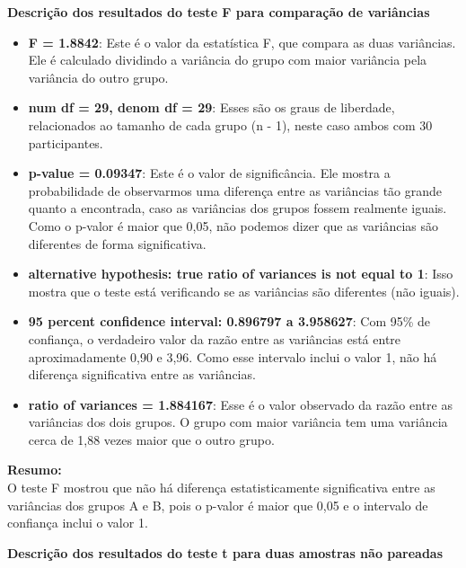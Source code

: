 \documentclass[
]{book}
\providecommand{\tightlist}{%
  \setlength{\itemsep}{0pt}\setlength{\parskip}{0pt}}
\begin{document}
\textbf{Descrição dos resultados do teste F para comparação de variâncias}

\begin{itemize}
\tightlist
\item
  \textbf{F = 1.8842}: Este é o valor da estatística F, que compara as duas variâncias. Ele é calculado dividindo a variância do grupo com maior variância pela variância do outro grupo.
\item
  \textbf{num df = 29, denom df = 29}: Esses são os graus de liberdade, relacionados ao tamanho de cada grupo (n - 1), neste caso ambos com 30 participantes.
\item
  \textbf{p-value = 0.09347}: Este é o valor de significância. Ele mostra a probabilidade de observarmos uma diferença entre as variâncias tão grande quanto a encontrada, caso as variâncias dos grupos fossem realmente iguais. Como o p-valor é maior que 0,05, não podemos dizer que as variâncias são diferentes de forma significativa.
\item
  \textbf{alternative hypothesis: true ratio of variances is not equal to 1}: Isso mostra que o teste está verificando se as variâncias são diferentes (não iguais).
\item
  \textbf{95 percent confidence interval: 0.896797 a 3.958627}: Com 95\% de confiança, o verdadeiro valor da razão entre as variâncias está entre aproximadamente 0,90 e 3,96. Como esse intervalo inclui o valor 1, não há diferença significativa entre as variâncias.
\item
  \textbf{ratio of variances = 1.884167}: Esse é o valor observado da razão entre as variâncias dos dois grupos. O grupo com maior variância tem uma variância cerca de 1,88 vezes maior que o outro grupo.
\end{itemize}

\textbf{Resumo:}\\
O teste F mostrou que não há diferença estatisticamente significativa entre as variâncias dos grupos A e B, pois o p-valor é maior que 0,05 e o intervalo de confiança inclui o valor 1.

\textbf{Descrição dos resultados do teste t para duas amostras não pareadas}
\end{document}
